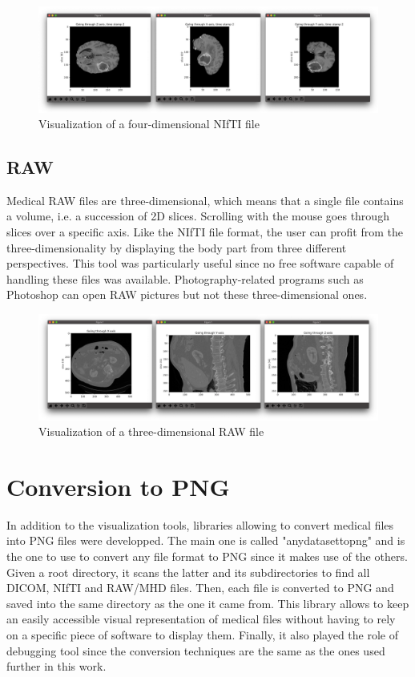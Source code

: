 \begin{figure}[!h]
\centering
\includegraphics[width=\textwidth, keepaspectratio=true]{./figures/visualize_brain_nii.png}
\caption{Visualization of a four-dimensional NIfTI file}
\label{fig:visualize_brain_nii}
\end{figure}


\subsection{RAW}
Medical RAW files are three-dimensional, which means that a single file contains a volume, i.e. a succession of 2D slices. Scrolling with the mouse goes through slices over a specific axis. Like the NIfTI file format, the user can profit from the three-dimensionality by displaying the body part from three different perspectives. This tool was particularly useful since no free software capable of handling these files was available. Photography-related programs such as Photoshop can open RAW pictures but not these three-dimensional ones. 

\begin{figure}[!h]
\centering
\includegraphics[width=\textwidth, keepaspectratio=true]{./figures/visualize_liver_raw.png}
\caption{Visualization of a three-dimensional RAW file}
\label{fig:visualize_liver_raw}
\end{figure}



\section{Conversion to PNG}

In addition to the visualization tools, libraries allowing to convert medical files into PNG files were developped. The main one is called "anydatasettopng" and is the one to use to convert any file format to PNG since it makes use of the others. Given a root directory, it scans the latter and its subdirectories to find all DICOM, NIfTI and RAW/MHD files. Then, each file is converted to PNG and saved into the same directory as the one it came from. This library allows to keep an easily accessible visual representation of medical files without having to rely on a specific piece of software to display them. Finally, it also played the role of debugging tool since the conversion techniques are the same as the ones used further in this work. 


